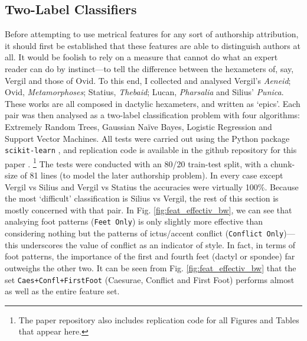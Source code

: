 \documentclass[11pt,a4paper]{scrartcl} %
\begin{document}
{\subsection{Two-Label Classifiers}

Before attempting to use metrical features for any sort of authorship attribution, it should first be established that these features are able to distinguish authors at all. It would be foolish to rely on a measure that cannot do what an expert reader can do by instinct---to tell the difference between the hexameters of, say, Vergil and those of Ovid. To this end, I collected and analysed Vergil's \textit{Aeneid}; Ovid, \textit{Metamorphoses}; Statius, \textit{Thebaid}; Lucan, \textit{Pharsalia} and Silius' \textit{Punica}. These works are all composed in dactylic hexameters, and written as `epics'. Each pair was then analysed as a two-label classification problem with four algorithms: Extremely Random Trees, Gaussian Naïve Bayes, Logistic Regression and Support Vector Machines. All tests were carried out using the Python package \texttt{scikit-learn} \cite{scikit-learn}, and replication code is available in the github repository for this paper \cite{nagy_hexml_2019}.%
\footnote{The paper repository also includes replication code for all Figures and Tables that appear here.}
The tests were conducted with an 80/20 train-test split, with a chunk-size of 81 lines (to model the later authorship problem). In every case except Vergil vs Silius and Vergil vs Statius the accuracies were virtually 100\%. Because the most `difficult' classification is Silius vs Vergil, the rest of this section is mostly concerned with that pair. In Fig. \ref{fig:feat_effectiv_bw}, we can see that analsying foot patterns (\texttt{Feet Only}) is only slightly more effective than considering nothing but the patterns of ictus/accent conflict (\texttt{Conflict Only})---this underscores the value of conflict as an indicator of style. In fact, in terms of foot patterns, the importance of the first and fourth feet (dactyl or spondee) far outweighs the other two. It can be seen from Fig. \ref{fig:feat_effectiv_bw} that the set \texttt{Caes+Confl+FirstFoot} (Caesurae, Conflict and First Foot) performs almost as well as the entire feature set.

}
\end{document}
